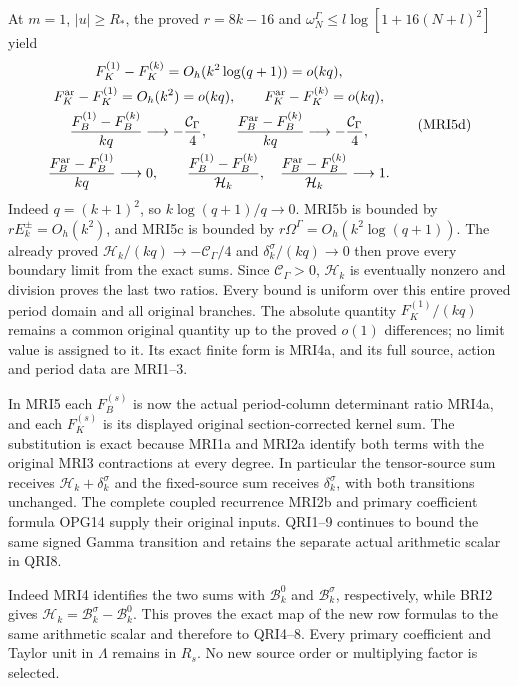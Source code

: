 \documentclass[11pt,a4paper]{article}
\begin{document}
At $m=1$, $|u|\ge R_*$, the proved $r=8k-16$ and
$\omega_N^\Gamma\le l\log[1+16(N+l)^2]$ yield
\[
\begin{gathered}
 F_K^{(1)}-F_K^{(k)}=O_h(k^2\log(q+1))=o(kq),\\
 F_K^{\rm ar}-F_K^{(1)}=O_h(k^2)=o(kq),\qquad
 F_K^{\rm ar}-F_K^{(k)}=o(kq),\\
 \frac{F_B^{(1)}-F_B^{(k)}}{kq}\longrightarrow-\frac{\mathcal C_\Gamma}{4},
 \qquad\frac{F_B^{\rm ar}-F_B^{(k)}}{kq}
                                      \longrightarrow-\frac{\mathcal C_\Gamma}{4},\\
 \frac{F_B^{\rm ar}-F_B^{(1)}}{kq}\longrightarrow0,\qquad
 \frac{F_B^{(1)}-F_B^{(k)}}{\mathcal H_k},\quad
 \frac{F_B^{\rm ar}-F_B^{(k)}}{\mathcal H_k}\longrightarrow1.
\end{gathered}\tag{MRI5d}
\]
Indeed $q=(k+1)^2$, so $k\log(q+1)/q\to0$.
MRI5b is bounded by $rE_k^\pm=O_h(k^2)$, and MRI5c
is bounded by $r\Omega^\Gamma=O_h(k^2\log(q+1))$.
The already proved $\mathcal H_k/(kq)\to-\mathcal C_\Gamma/4$
and $\delta_k^\sigma/(kq)\to0$ then prove every boundary
limit from the exact sums. Since $\mathcal C_\Gamma>0$,
$\mathcal H_k$ is eventually nonzero and division proves
the last two ratios. Every bound is uniform over this entire
proved period domain and all original branches. The absolute
quantity $F_K^{(1)}/(kq)$ remains a common original quantity
up to the proved $o(1)$ differences; no limit value is assigned
to it. Its exact finite form is MRI4a, and its full source,
action and period data are MRI1--3.


In MRI5 each $F_B^{(s)}$ is now the actual period-column determinant
ratio MRI4a, and each $F_K^{(s)}$ is its displayed original
section-corrected kernel sum. The substitution is exact because
MRI1a and MRI2a identify both terms with the original MRI3
contractions at every degree. In particular the tensor-source
sum receives $\mathcal H_k+\delta_k^\sigma$ and the fixed-source
sum receives $\delta_k^\sigma$, with both transitions unchanged.
The complete coupled recurrence MRI2b and primary coefficient
formula OPG14 supply their original inputs. QRI1--9 continues
to bound the same signed Gamma transition and retains the
separate actual arithmetic scalar in QRI8.

Indeed MRI4 identifies the two sums with $\mathcal B_k^0$ and
$\mathcal B_k^\sigma$, respectively, while BRI2 gives
$\mathcal H_k=\mathcal B_k^\sigma-\mathcal B_k^0$.
This proves the exact map of the new row formulas to the same
arithmetic scalar and therefore to QRI4--8. Every primary
coefficient and Taylor unit in $\Lambda$ remains in $R_s$.
No new source order or multiplying factor is selected.
\end{document}
